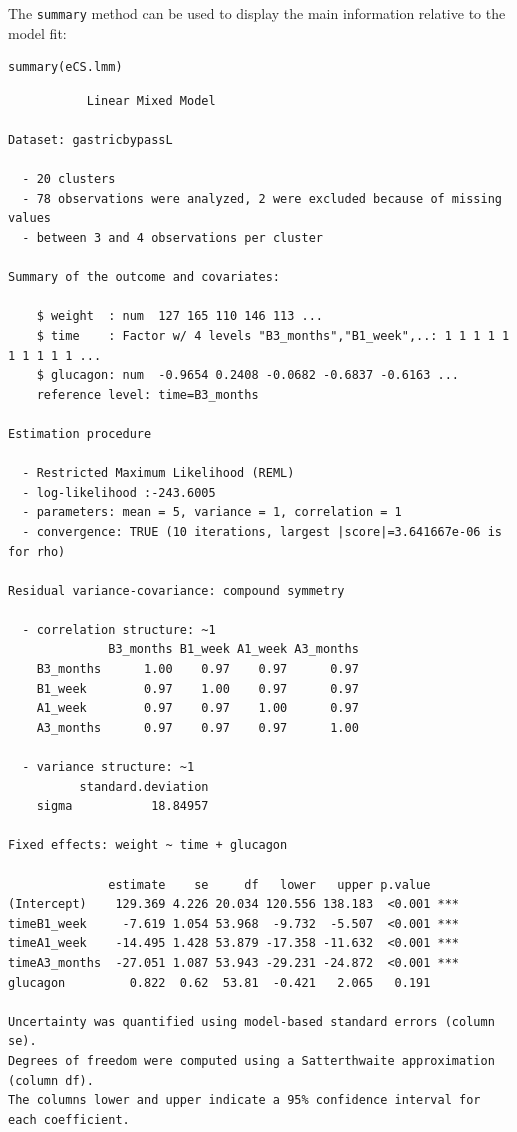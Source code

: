\documentclass[12pt]{article}
\begin{document}
The \texttt{summary} method can be used to display the main information
relative to the model fit:
\lstset{language=r,label= ,caption= ,captionpos=b,numbers=none}
\begin{lstlisting}
summary(eCS.lmm)
\end{lstlisting}

\begin{verbatim}
           Linear Mixed Model 
 
Dataset: gastricbypassL 

  - 20 clusters 
  - 78 observations were analyzed, 2 were excluded because of missing values 
  - between 3 and 4 observations per cluster 

Summary of the outcome and covariates: 

    $ weight  : num  127 165 110 146 113 ...
    $ time    : Factor w/ 4 levels "B3_months","B1_week",..: 1 1 1 1 1 1 1 1 1 1 ...
    $ glucagon: num  -0.9654 0.2408 -0.0682 -0.6837 -0.6163 ...
    reference level: time=B3_months 

Estimation procedure 

  - Restricted Maximum Likelihood (REML) 
  - log-likelihood :-243.6005
  - parameters: mean = 5, variance = 1, correlation = 1
  - convergence: TRUE (10 iterations, largest |score|=3.641667e-06 is for rho)
 
Residual variance-covariance: compound symmetry 

  - correlation structure: ~1 
              B3_months B1_week A1_week A3_months
    B3_months      1.00    0.97    0.97      0.97
    B1_week        0.97    1.00    0.97      0.97
    A1_week        0.97    0.97    1.00      0.97
    A3_months      0.97    0.97    0.97      1.00

  - variance structure: ~1 
          standard.deviation
    sigma           18.84957

Fixed effects: weight ~ time + glucagon 

              estimate    se     df   lower   upper p.value    
(Intercept)    129.369 4.226 20.034 120.556 138.183  <0.001 ***
timeB1_week     -7.619 1.054 53.968  -9.732  -5.507  <0.001 ***
timeA1_week    -14.495 1.428 53.879 -17.358 -11.632  <0.001 ***
timeA3_months  -27.051 1.087 53.943 -29.231 -24.872  <0.001 ***
glucagon         0.822  0.62  53.81  -0.421   2.065   0.191    

Uncertainty was quantified using model-based standard errors (column se). 
Degrees of freedom were computed using a Satterthwaite approximation (column df). 
The columns lower and upper indicate a 95% confidence interval for each coefficient.
\end{verbatim}
\end{document}
